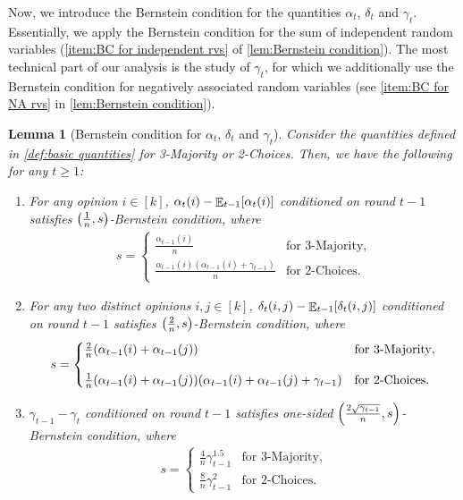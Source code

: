 \documentclass[letterpaper,11pt]{article}
\newtheorem{lemma}[theorem]{Lemma}
\DeclarePairedDelimiter{\sbra}{\lbrack}{\rbrack} %
\DeclareMathOperator*{\E}{\mathbb{E}}
\newcommand{\alphanorm}{\gamma}
\newcommand{\variance}{s}
\begin{document}
Now, we introduce the Bernstein condition for the quantities $\alpha_t$, $\delta_t$ and $\alphanorm_t$.
Essentially, we apply the Bernstein condition for the sum of independent random variables (\cref{item:BC for independent rvs} of \cref{lem:Bernstein condition}).
The most technical part of our analysis is the study of $\alphanorm_t$, for which we additionally use the Bernstein condition for negatively associated random variables (see \cref{item:BC for NA rvs} in \cref{lem:Bernstein condition}).
\begin{lemma}[Bernstein condition for $\alpha_t$, $\delta_t$ and $\alphanorm_t$]
\label{lem:Bernstein condition for sync processes}
Consider the quantities defined in \cref{def:basic quantities} for 3-Majority or 2-Choices.
Then, we have the following for any $t\geq 1$:
\begin{enumerate}
            \renewcommand{\labelenumi}{(\roman{enumi})}
    \item \label{item:BC for alpha}
    For any opinion $i\in [k]$, 
    $\alpha_{t}(i)-\E_{t-1}\sbra*{\alpha_t(i)}$ conditioned on round $t-1$ satisfies $\qty(\frac{1}{n},\variance)$-Bernstein condition, where
    \begin{align*} 
       \variance = \begin{cases}
        \frac{\alpha_{t-1}(i)}{n}	& \text{for 3-Majority},\\
        \frac{\alpha_{t-1}(i)(\alpha_{t-1}(i)+\alphanorm_{t-1})}{n} & \text{for 2-Choices}.
       \end{cases}
    \end{align*}
    \item \label{item:BC for delta}
     For any two distinct opinions $i,j\in [k]$,
     $\delta_{t}(i,j)-\E_{t-1}\sbra*{\delta_t(i,j)}$ conditioned on round $t-1$ satisfies $ \qty(\frac{2}{n}, \variance) $-Bernstein condition, 
     where
    \begin{align*} 
       \variance = \begin{cases}
          \frac{2}{n}(\alpha_{t-1}(i)+\alpha_{t-1}(j))	& \text{for 3-Majority},\\[10pt]
          \frac{1}{n}\qty(\alpha_{t-1}(i) + \alpha_{t-1}(j))\qty(\alpha_{t-1}(i)+\alpha_{t-1}(j)+\alphanorm_{t-1}) & \text{for 2-Choices}.
       \end{cases} 
    \end{align*}
    \item \label{item:BC for alphanorm}
     $\alphanorm_{t-1}-\alphanorm_t$ conditioned on round $t-1$ satisfies one-sided $ \qty(\frac{2\sqrt{\alphanorm_{t-1}}}{n},\variance)$-Bernstein condition, where
    \begin{align*}
       \variance = \begin{cases}
          \frac{4}{n}\alphanorm_{t-1}^{1.5}	& \text{for 3-Majority},\\[10pt]
          \frac{8}{n}\alphanorm_{t-1}^2 & \text{for 2-Choices}.
       \end{cases}
    \end{align*} 
\end{enumerate}
\end{lemma}
\end{document}
